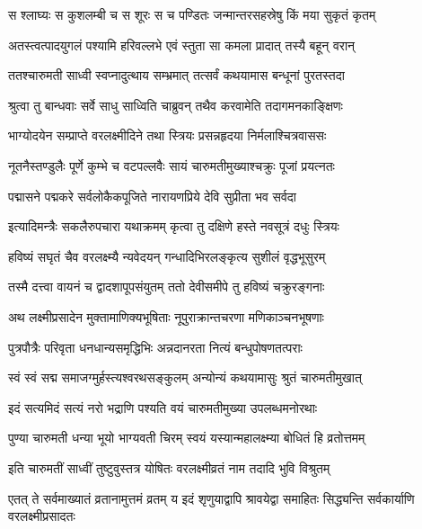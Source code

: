 \twolineshloka
{स श्लाघ्यः स कुशलम्बी च स शूरः स च पण्डितः}
{जन्मान्तरसहस्रेषु किं मया सुकृतं कृतम्} %

\twolineshloka
{अतस्त्वत्पादयुगलं पश्यामि हरिवल्लभे}
{एवं स्तुता सा कमला प्रादात् तस्यै बहून् वरान्} %

\twolineshloka
{ततश्चारुमती साध्वी स्वप्नादुत्थाय सम्भ्रमात्}
{तत्सर्वं कथयामास बन्धूनां पुरतस्तदा} %

\twolineshloka
{श्रुत्वा तु बान्धवाः सर्वे साधु साध्विति चाब्रुवन्}
{तथैव करवामेति तदागमनकाङ्क्षिणः} %

\twolineshloka
{भाग्योदयेन सम्प्राप्ते वरलक्ष्मीदिने तथा}
{स्त्रियः प्रसन्नहृदया निर्मलाश्चित्रवाससः} %

\twolineshloka
{नूतनैस्तण्डुलैः पूर्णे कुम्भे च वटपल्लवैः}
{सायं चारुमतीमुख्याश्चक्रुः पूजां प्रयत्नतः} %

\twolineshloka
{पद्मासने पद्मकरे सर्वलोकैकपूजिते}
{नारायणप्रिये देवि सुप्रीता भव सर्वदा} %

\twolineshloka
{इत्यादिमन्त्रैः सकलैरुपचारा यथाक्रमम्}
{कृत्वा तु दक्षिणे हस्ते नवसूत्रं दधुः स्त्रियः} %

\twolineshloka
{हविष्यं सघृतं चैव वरलक्ष्म्यै न्यवेदयन्}
{गन्धादिभिरलङ्कृत्य सुशीलं वृद्धभूसुरम्} %

\twolineshloka
{तस्मै दत्त्वा वायनं च द्वादशापूपसंयुतम्}
{ततो देवीसमीपे तु हविष्यं चक्रुरङ्गनाः} %

\twolineshloka
{अथ लक्ष्मीप्रसादेन मुक्तामाणिक्यभूषिताः}
{नूपुराक्रान्तचरणा मणिकाञ्चनभूषणाः} %

\twolineshloka
{पुत्रपौत्रैः परिवृता धनधान्यसमृद्धिभिः}
{अन्नदानरता नित्यं बन्धुपोषणतत्पराः} %

\twolineshloka
{स्वं स्वं सद्म समाजग्मुर्हस्त्यश्वरथसङ्कुलम्}
{अन्योन्यं कथयामासुः श्रुतं चारुमतीमुखात्} %

\twolineshloka
{इदं सत्यमिदं सत्यं नरो भद्राणि पश्यति}
{वयं चारुमतीमुख्या उपलब्धमनोरथाः} %

\twolineshloka
{पुण्या चारुमती धन्या भूयो भाग्यवती चिरम्}
{स्वयं यस्यान्महालक्ष्म्या बोधितं हि व्रतोत्तमम्} %

\twolineshloka
{इति चारुमतीं साध्वीं तुष्टुवुस्तत्र योषितः}
{वरलक्ष्मीव्रतं नाम तदादि भुवि विश्रुतम्} %

\threelineshloka
{एतत् ते सर्वमाख्यातं व्रतानामुत्तमं व्रतम्}
{य इदं शृणुयाद्वापि श्रावयेद्वा समाहितः}
{सिद्ध्यन्ति सर्वकार्याणि वरलक्ष्मीप्रसादतः} %

